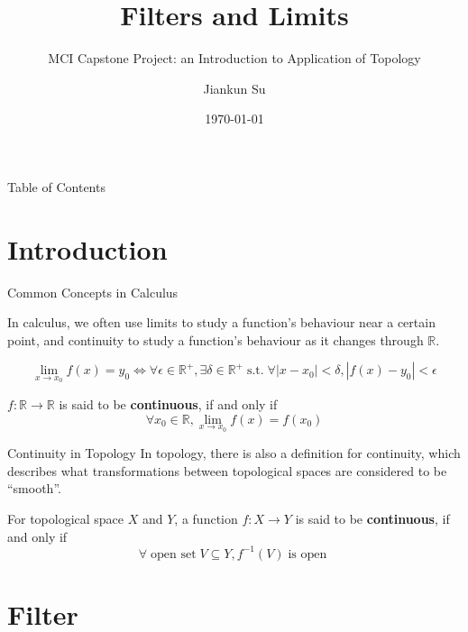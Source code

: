 \documentclass[aspectratio=169]{beamer}
\title{Filters and Limits}
\subtitle{MCI Capstone Project: an Introduction to Application of Topology}
\author{Jiankun Su}
\institute{No.2 High School of East China Normal University}
\date{\today}
\newcommand{\R}{\mathbb{R}}
\newcommand{\msg}[1]{\; \text{#1} \;}
\newcommand{\st}{\msg{s.t.}}
\begin{document}
	\begin{frame}
		\titlepage
	\end{frame}

	\begin{frame}{Table of Contents}
		\tableofcontents
	\end{frame}

	\section{Introduction}
	
	\begin{frame}{Common Concepts in Calculus}
		
		In calculus, we often use limits to study a function's behaviour near a certain point,
		and continuity to study a function's behaviour as it changes through $\R$.
		
		\begin{definition}[$\epsilon$-$\delta$ Language of Limit]
			$$
			\lim_{x \to  x_0} f(x) = y_0 \iff
			\forall \epsilon \in \mathbb R^+, \exists \delta \in \mathbb R^+ \st
			\forall \left| x-x_0 \right| < \delta, \left| f(x) - y_0 \right| < \epsilon
			$$
		\end{definition}
		
		\begin{definition}[Continuity]
			$f: \mathbb R \to \R$ is said to be \textbf{continuous}, if and only if
			$$
			\forall x_0 \in \R, \lim_{x \to x_0} f(x) = f(x_0)
			$$
		\end{definition}
	\end{frame}
	
	\begin{frame}{Continuity in Topology}
		In topology, there is also a definition for continuity,
		which describes what transformations between topological spaces are considered to be ``smooth''.
		\begin{definition}
			For topological space $X$ and $Y$, a function $f: X \to Y$ is said to be \textbf{continuous}, if and only if
			$$
			\forall \msg{open set} V \subseteq Y, f^{-1}(V) \msg{is open}
			$$
		\end{definition}
	\end{frame}

	\section{Filter}
	
\end{document}
